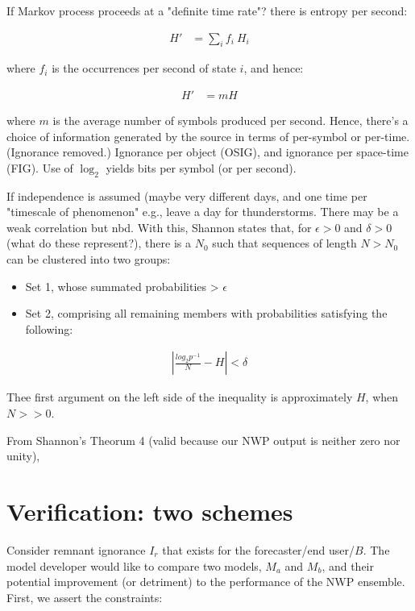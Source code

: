 \documentclass{ametsoc}
\def\gt{\textgreater}
\begin{document}
If Markov process proceeds at a "definite time rate"? there is entropy per second:

\begin{align}
   H' &= \sum_i f_i~H_i
\end{align}

where $f_i$ is the occurrences per second of state $i$, and hence:

\begin{align}
   H' &= mH
\end{align}

where $m$ is the average number of symbols produced per second. Hence, there's a choice of information generated by the source in terms of per-symbol or per-time. (Ignorance removed.) Ignorance per object (OSIG), and ignorance per space-time (FIG). Use of $\log_2$ yields bits per symbol (or per second).

If independence is assumed (maybe very different days, and one time per "timescale of phenomenon" e.g., leave a day for thunderstorms. There may be a weak correlation but nbd. With this, Shannon states that, for $\epsilon > 0$ and $\delta > 0$ (what do these represent?), there is a $N_0$ such that sequences of length $N > N_0$ can be clustered into two groups:

\begin{itemize}
    \item Set 1, whose summated probabilities \gt{} $\epsilon$
    \item Set 2, comprising all remaining members with probabilities satisfying the following:
\end{itemize}

\begin{align}
    \left| \frac{log_2 p^{-1}}{N} - H \right| < \delta
\end{align}

Thee first argument on the left side of the inequality is approximately $H$, when $N>>0$.

From Shannon's Theorum 4 (valid because our NWP output is neither zero nor unity), 

\section{Verification: two schemes}
Consider remnant ignorance $I_r$ that exists for the forecaster/end user/$B$. The model developer would like to compare two models, $M_a$ and $M_b$, and their potential improvement (or detriment) to the performance of the NWP ensemble. First, we assert the constraints:
\end{document}
